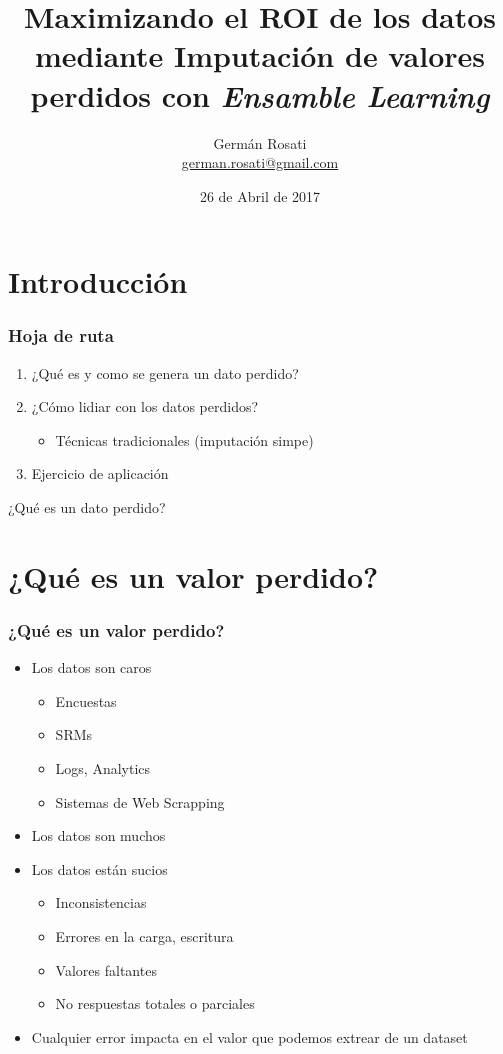 \documentclass{beamer}
\title[Imputación usando Ensamble Learning]{Maximizando el ROI de los datos mediante Imputación de valores perdidos con \emph{Ensamble Learning}}
\author{Germán Rosati \\ \href{mailto: german.rosati@gmail.com}{german.rosati@gmail.com}}
\institute{UNTREF / MTEySS / Digital House}
\date{26 de Abril de 2017}
\begin{document}
\frame{\titlepage}


\section{Introducción}
\begin{frame}
	\frametitle{Hoja de ruta}
	\begin{enumerate}
		\item{¿Qué es y como se genera un dato perdido?}
		\item{¿Cómo lidiar con los datos perdidos?}
		\begin{itemize}
			\item{Técnicas tradicionales (imputación simpe)}
		\end{itemize}
		\item{Ejercicio de aplicación}
	\end{enumerate}
\end{frame}

\begin{frame}
	\begin{center}
		{\huge ¿Qué es un dato perdido?
			\linebreak
			\linebreak
			\linebreak
			\linebreak}
	\end{center}
\end{frame}

\section{¿Qué es un valor perdido?}
\begin{frame}
	\frametitle{¿Qué es un valor perdido?}
	\begin{itemize}
		\item{Los datos son caros}
		\begin{itemize}
			\item{Encuestas}
			\item{SRMs}
			\item{Logs, Analytics}
			\item{Sistemas de Web Scrapping}
		\end{itemize}
		\item{Los datos son muchos}
		\item{Los datos están sucios}
		\begin{itemize}
			\item{Inconsistencias}
			\item{Errores en la carga, escritura}
			\item{Valores faltantes}
			\item{No respuestas totales o parciales}
		\end{itemize}
		\item{Cualquier error impacta en el valor que podemos extrear de un dataset}
	\end{itemize}
\end{frame}
	 
\end{document}
